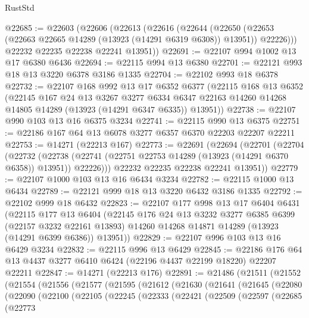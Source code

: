 \begin{lexlean}{RustStd}
\begin{coremodule}
@22685 := @22603
    (@22606
      (@22613
        (@22616
          (@22644
            (@22650 (@22653 (@22663 @22665 @14289 (@13923 (@14291 @6319 @6308)) @13951)) @22226)))
        @22232
        @22235
        @22238
        @22241
        @13951))
@22691 := @22107 @994 @1002 @13 @17 @6380 @6436
@22694 := @22115 @994 @13 @6380
@22701 := @22121 @993 @18 @13 @3220 @6378 @3186 @1335
@22704 := @22102 @993 @18 @6378
@22732 := @22107
    @168
    @992
    @13
    @17
    @6352
    @6377
    (@22115
      @168
      @13
      @6352
      (@22145
        @167
        @24
        @13
        @3267
        @3277
        @6334
        @6347
        @22163
        @14260
        @14268
        @14805
        @14289
        (@13923 (@14291 @6347 @6335))
        @13951))
@22738 := @22107 @990 @103 @13 @16 @6375 @3234
@22741 := @22115 @990 @13 @6375
@22751 := @22186 @167 @64 @13 @6078 @3277 @6357 @6370 @22203 @22207 @22211
@22753 := @14271 (@22213 @167)
@22773 := @22691
    (@22694
      (@22701
        (@22704
          (@22732
            (@22738 (@22741 (@22751 @22753 @14289 (@13923 (@14291 @6370 @6358)) @13951)) @22226)))
        @22232
        @22235
        @22238
        @22241
        @13951))
@22779 := @22107 @1000 @103 @13 @16 @6434 @3234
@22782 := @22115 @1000 @13 @6434
@22789 := @22121 @999 @18 @13 @3220 @6432 @3186 @1335
@22792 := @22102 @999 @18 @6432
@22823 := @22107
    @177
    @998
    @13
    @17
    @6404
    @6431
    (@22115
      @177
      @13
      @6404
      (@22145
        @176
        @24
        @13
        @3232
        @3277
        @6385
        @6399
        (@22157 @3232 @22161 @13893)
        @14260
        @14268
        @14871
        @14289
        (@13923 (@14291 @6399 @6386))
        @13951))
@22829 := @22107 @996 @103 @13 @16 @6429 @3234
@22832 := @22115 @996 @13 @6429
@22845 := @22186 @176 @64 @13 @4437 @3277 @6410 @6424 (@22196 @4437 @22199 @18220) @22207 @22211
@22847 := @14271 (@22213 @176)
@22891 := @21486
    (@21511
      (@21552
        (@21554
          (@21556
            (@21577
              (@21595
                (@21612
                  (@21630
                    (@21641
                      (@21645
                        (@22080
                          (@22090
                            (@22100
                              (@22105
                                (@22245
                                  (@22333
                                    (@22421
                                      (@22509
                                        (@22597
                                          (@22685
                                            (@22773

\end{coremodule}
\end{lexlean}
